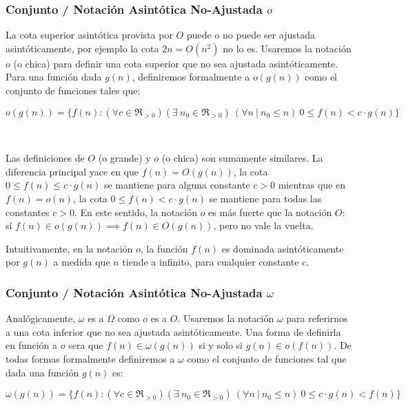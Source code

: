 \subsubsection{Conjunto / Notaci\'on Asint\'otica No-Ajustada $o$}

La cota superior asint\'otica provista por $O$ puede o no puede ser ajustada asint\'oticamente, por ejemplo la cota $2n = O(n^2)$ no lo es. Usaremos la notaci\'on $o$ (o chica) para definir una cota superior que no sea ajustada asint\'oticamente. Para una funci\'on dada $g(n)$, definiremos formalmente a $o(g(n))$ como el conjunto de funciones tales que:

\begin{equation*}
 o(g(n)) = \{ f(n) : (\forall c \in \Re_{>0})(\exists\ n_0 \in \Re_{>0}) \ (\forall n\ |\ n_0 \leq n)\ 0 \leq f(n) < c \cdot g(n) \}
\end{equation*}

~

Las definiciones de $O$ (o grande) y $o$ (o chica) son sumamente similares. La diferencia principal yace en que $f(n) = O(g(n))$, la cota $0 \leq f(n) \leq c \cdot g(n)$ se mantiene para alguna constante $c > 0$ mientras que en $f(n) = o(n)$, la cota $0 \leq f(n) < c \cdot g(n)$ se mantiene para todas las constantes $c > 0$.
En este sentido, la notaci\'on $o$ es m\'as fuerte que la notaci\'on $O$: s\'i $f(n) \in o(g(n)) \implies f(n) \in O(g(n))$, pero no vale la vuelta.

Intuitivamente, en la notaci\'on $o$, la funci\'on $f(n)$ es dominada asint\'oticamente por $g(n)$ a medida que $n$ tiende a infinito, para cualquier constante $c$.

\subsubsection{Conjunto / Notaci\'on Asint\'otica No-Ajustada $\omega$}

Anal\'ogicamente, $\omega$ es a $\Omega$ como $o$ es a $O$. Usaremos la notaci\'on $\omega$ para referirnos a una cota inferior que no sea ajustada asint\'oticamente. Una forma de definirla en funci\'on a $o$ sera que $f(n) \in \omega(g(n))$ si y solo si $g(n) \in o(f(n))$. De todas formas formalmente definiremos a $\omega$ como el conjunto de funciones tal que dada una funci\'on $g(n)$ es:

\begin{equation*}
 \omega(g(n)) = \{ f(n) : (\forall c \in \Re_{>0})(\exists\ n_0 \in \Re_{>0}) \ (\forall n\ |\ n_0 \leq n)\ 0 \leq c \cdot g(n) < f(n) \}
\end{equation*}

